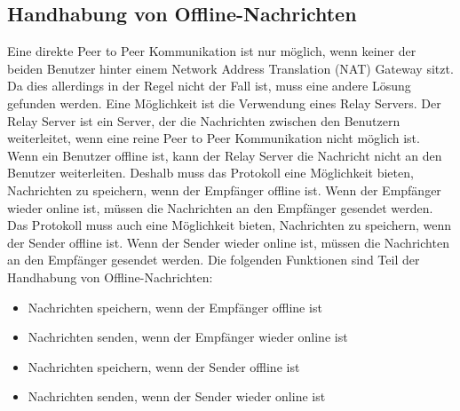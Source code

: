 \subsection{Handhabung von Offline-Nachrichten}

Eine direkte Peer to Peer Kommunikation ist nur möglich, wenn keiner der beiden Benutzer hinter einem 
Network Address Translation (NAT) Gateway sitzt. Da dies allerdings in der Regel nicht der Fall ist,
muss eine andere Lösung gefunden werden. Eine Möglichkeit ist die Verwendung eines Relay Servers.
Der Relay Server ist ein Server, der die Nachrichten zwischen den Benutzern weiterleitet, wenn eine reine Peer to Peer
Kommunikation nicht möglich ist. Wenn ein Benutzer offline ist, kann der Relay Server die Nachricht nicht an 
den Benutzer weiterleiten.
Deshalb muss das Protokoll eine Möglichkeit bieten, Nachrichten zu speichern, wenn der Empfänger offline ist.
Wenn der Empfänger wieder online ist, müssen die Nachrichten an den Empfänger gesendet werden.
Das Protokoll muss auch eine Möglichkeit bieten, Nachrichten zu speichern, wenn der Sender offline ist.
Wenn der Sender wieder online ist, müssen die Nachrichten an den Empfänger gesendet werden.
Die folgenden Funktionen sind Teil der Handhabung von Offline-Nachrichten:

\begin{itemize}
    \item Nachrichten speichern, wenn der Empfänger offline ist
    \item Nachrichten senden, wenn der Empfänger wieder online ist
    \item Nachrichten speichern, wenn der Sender offline ist
    \item Nachrichten senden, wenn der Sender wieder online ist
\end{itemize}



